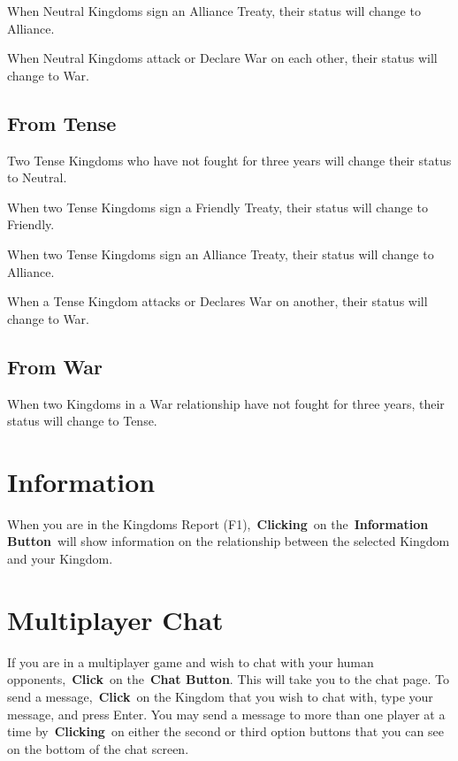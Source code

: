 When Neutral Kingdoms sign an Alliance Treaty, their status will change to Alliance.

When Neutral Kingdoms attack or Declare War on each other, their status will change to War.

\subsection{From Tense}

Two Tense Kingdoms who have not fought for three years will change their status to Neutral.

When two Tense Kingdoms sign a Friendly Treaty, their status will change to Friendly.

When two Tense Kingdoms sign an Alliance Treaty, their status will change to Alliance.

When a Tense Kingdom attacks or Declares War on another, their status will change to War.

\subsection{From War}

When two Kingdoms in a War relationship have not fought for three years, their status will change to Tense.

\section{Information}

When you are in the Kingdoms Report (F1), \textbf{Clicking} on the \textbf{Information Button} will show information on the relationship between the selected Kingdom and your Kingdom.

\section{Multiplayer Chat}

If you are in a multiplayer game and wish to chat with your human opponents, \textbf{Click} on the \textbf{Chat Button}. This will take you to the chat page. To send a message, \textbf{Click} on the Kingdom that you wish to chat with, type your message, and press Enter. You may send a message to more than one player at a time by \textbf{Clicking} on either the second or third option buttons that you can see on the bottom of the chat screen.

